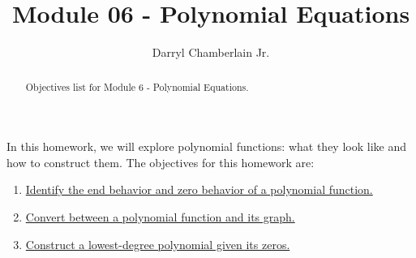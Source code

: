 \documentclass{ximera}
\author{Darryl Chamberlain Jr.}
\title{Module 06 - Polynomial Equations}
\begin{document}
\begin{abstract}
Objectives list for Module 6 - Polynomial Equations. 
\end{abstract}
\maketitle

In this homework, we will explore polynomial functions: what they look like and how to construct them. The objectives for this homework are:
\begin{enumerate}
    \item \href{https://cnx.org/contents/mwjClAV_@8.1:ZE9qk3Qp@12/Graphs-of-Polynomial-Functions}{Identify the end behavior and zero behavior of a polynomial function.}
	\item \href{https://cnx.org/contents/mwjClAV_@8.1:ZE9qk3Qp@12/Graphs-of-Polynomial-Functions}{Convert between a polynomial function and its graph.}
	\item \href{https://cnx.org/contents/mwjClAV_@8.1:G7V9LHif@17/Zeros-of-Polynomial-Functions}{Construct a lowest-degree polynomial given its zeros.}
\end{enumerate}
\end{document}
